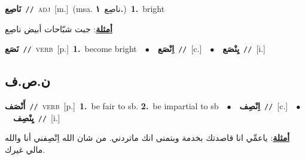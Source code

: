 \documentclass[10pt,a4paper,twoside]{article} %
\begin{document}
\begin{multicols}{2}
{\setlength\topsep{0pt}\textbf{\foreignlanguage{arabic}{نَاصِع}}\ {\color{gray}\texttt{//}\color{black}}\ \textsc{adj}\ [m.]\ \color{gray}(msa. \foreignlanguage{arabic}{ناصِع}~\foreignlanguage{arabic}{\textbf{١.}})\color{black}\ \textbf{1.}~bright\  \begin{flushright}\color{gray}\foreignlanguage{arabic}{\textbf{\underline{\foreignlanguage{arabic}{أمثلة}}}: جبت شبّاحات أبيض ناصِع}\end{flushright}\color{black}} \vspace{2mm}

{\setlength\topsep{0pt}\textbf{\foreignlanguage{arabic}{نَصَع}}\ {\color{gray}\texttt{//}\color{black}}\ \textsc{verb}\ [p.]\ \textbf{1.}~become bright\ \ $\bullet$\ \ \setlength\topsep{0pt}\textbf{\foreignlanguage{arabic}{اِنْصَع}}\ {\color{gray}\texttt{//}\color{black}}\ [c.]\ \ $\bullet$\ \ \setlength\topsep{0pt}\textbf{\foreignlanguage{arabic}{يِنْصَع}}\ {\color{gray}\texttt{//}\color{black}}\ [i.]\ } \vspace{2mm}

\vspace{-3mm}
\subsection*{\color{blue}\foreignlanguage{arabic}{ن.ص.ف}\color{blue}{}} 

{\setlength\topsep{0pt}\textbf{\foreignlanguage{arabic}{أَنْصَف}}\ {\color{gray}\texttt{//}\color{black}}\ \textsc{verb}\ [p.]\ \textbf{1.}~be fair to sb.  \textbf{2.}~be impartial to sb\ \ $\bullet$\ \ \setlength\topsep{0pt}\textbf{\foreignlanguage{arabic}{اِنْصِف}}\ {\color{gray}\texttt{//}\color{black}}\ [c.]\ \ $\bullet$\ \ \setlength\topsep{0pt}\textbf{\foreignlanguage{arabic}{يِنْصِف}}\ {\color{gray}\texttt{//}\color{black}}\ [i.]\  \begin{flushright}\color{gray}\foreignlanguage{arabic}{\textbf{\underline{\foreignlanguage{arabic}{أمثلة}}}: ياعمِّي انا قاصدتك بخدمة وبتمنى انك ماتردني. من شان الله اِنْصِفني أنا والله مالي غيرك.}\end{flushright}\color{black}} \vspace{2mm}


\end{multicols}
\end{document}
